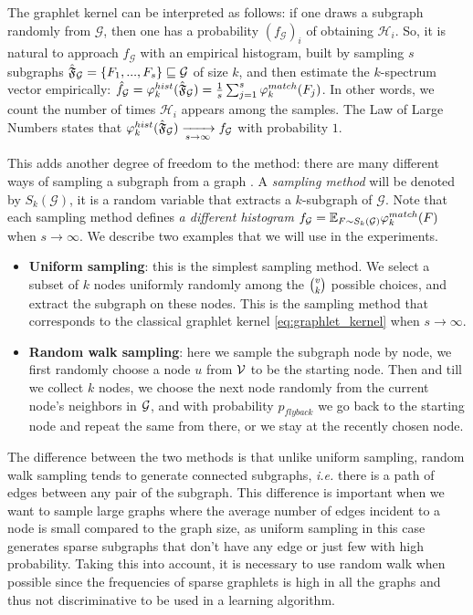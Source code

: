 The graphlet kernel can be interpreted as follows: if one draws a subgraph randomly from $\mathcal{G}$, then one has a probability $(f_\mathcal{G})_i$ of obtaining $\mathcal{H}_i$. So, it is natural to approach $f_\mathcal{G}$ with an empirical histogram, built by  sampling $s$ subgraphs $\hat{\mathfrak{F}}_{\mathcal{G}}=\{F_1,...,F_s\} \sqsubseteq \mathcal{G}$ of size $k$, and then estimate the $k$-spectrum vector empirically: $\hat f_\mathcal{G} =\varphi_k^{hist}(\hat{\mathfrak{F}}_{\mathcal{G}})= \frac{1}{s}\sum_{j=1}^s \varphi^{match}_k(F_j)$. In other words, we count the number of times $\mathcal{H}_i$ appears among the samples. The Law of Large Numbers states that $\varphi_k^{hist}(\hat{\mathfrak{F}}_{\mathcal{G}}) \xrightarrow[s \to \infty]{} f_\mathcal{G}$ with probability $1$.

This adds another degree of freedom to the method: there are many different ways of sampling a subgraph from a graph \citep{graph_sampling}. A \emph{sampling method} will be denoted by $S_k(\mathcal{G})$, it is a random variable that extracts a $k$-subgraph of $\mathcal{G}$. Note that each sampling method defines \emph{a different histogram} $f_\mathcal{G} = \mathbb{E}_{F \sim S_k(\mathcal{G})} \varphi^{match}_k(F)$ when $s \to \infty$. We describe two examples that we will use in the experiments.
\begin{itemize}
\item \textbf{Uniform sampling}: this is the simplest sampling method. We select a subset of $k$ nodes uniformly randomly among the $\tbinom{v}{k}$ possible choices, and extract the subgraph on these nodes. This is the sampling method that corresponds to the classical graphlet kernel \eqref{eq:graphlet_kernel} when $s \to \infty$.
\item \textbf{Random walk sampling}: here we sample the subgraph node by node, we first randomly choose a node $u$ from $\mathcal{V}$ to be the starting node. Then and till we collect $k$ nodes, we choose the next node randomly from the current node's neighbors in $\mathcal{G}$, and with probability $p_{flyback}$ we go back to the starting node and repeat the same from there, or we stay at the recently chosen node.
\end{itemize}
The difference between the two methods is that unlike uniform sampling, random walk sampling tends to generate connected subgraphs, \emph{i.e.} there is a path of edges between any pair of the subgraph. This difference is important when we want to sample large graphs where the average number of edges incident to a node is small compared to the graph size, as uniform sampling in this case generates sparse subgraphs that don't have any edge or just few with high probability. Taking this into account, it is necessary to use random walk when possible since the frequencies of sparse graphlets is high in all the graphs and thus not discriminative to be used in a learning algorithm.

